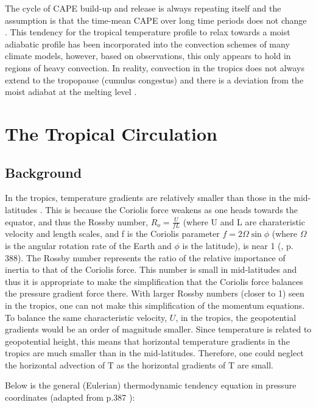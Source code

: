\documentclass[letterpaper,12pt,titlepage,oneside,final]{book}
\begin{document}
The cycle of CAPE build-up and release is always repeating itself and the assumption is that the time-mean CAPE over long time periods does not change \citep{emanuel_quasi-equilibrium_2007}. This tendency for the tropical temperature profile to relax towards a moist adiabatic profile has been incorporated into the convection schemes of many climate models, however, based on observations, this only appears to hold in regions of heavy convection. In reality, convection in the tropics does not always extend to the tropopause (cumulus congestus) and there is a deviation from the moist adiabat at the melting level \citep{folkins_melting_2013}.

\section{The Tropical Circulation}
\subsection{Background}\label{wtg}
In the tropics, temperature gradients are relatively smaller than those in the mid-latitudes \citep{sobel_weak_2001}. This is because the Coriolis force weakens as one heads towards the equator, and thus the Rossby number, $R_{o}=\frac{U}{fL}$ (where U and L are charateristic velocity and length scales, and f is the Coriolis parameter $f=2\Omega\sin{\phi}$ (where $\Omega$ is the angular rotation rate of the Earth and $\phi$ is the latitude), is near 1 (\citep{holton_introduction_2004}, p. 388). The Rossby number represents the ratio of the relative importance of inertia to that of the Coriolis force. This number is small in mid-latitudes and thus it is appropriate to make the simplification that the Coriolis force balances the pressure gradient force there. With larger Rossby numbers (closer to 1) seen in the tropics, one can not make this simplification of the momentum equations. To balance the same characteristic velocity, $U$, in the tropics, the geopotential gradients would be an order of magnitude smaller. Since temperature is related to geopotential height, this means that horizontal temperature gradients in the tropics are much smaller than in the mid-latitudes. Therefore, one could neglect the horizontal advection of T as the horizontal gradients of T are small. 

Below is the general (Eulerian) thermodynamic tendency equation in pressure coordinates (adapted from p.387 \citep{holton_introduction_2004}):
\end{document}
